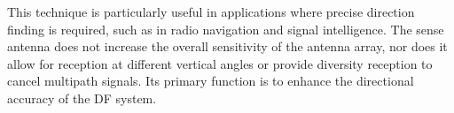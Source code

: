 This technique is particularly useful in applications where precise direction finding is required, such as in radio navigation and signal intelligence. The sense antenna does not increase the overall sensitivity of the antenna array, nor does it allow for reception at different vertical angles or provide diversity reception to cancel multipath signals. Its primary function is to enhance the directional accuracy of the DF system.

